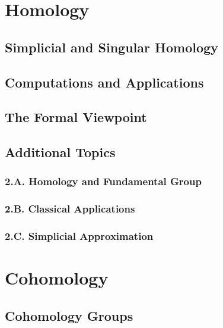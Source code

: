 \documentclass{article}
\begin{document}
\newpage

\section{Homology}

\subsection{Simplicial and Singular Homology}

\subsection{Computations and Applications}

\subsection{The Formal Viewpoint}

\subsection*{Additional Topics}

\subsubsection*{2.A. Homology and Fundamental Group}

\subsubsection*{2.B. Classical Applications}

\subsubsection*{2.C. Simplicial Approximation}

\newpage

\section{Cohomology}

\subsection{Cohomology Groups}
\end{document}
